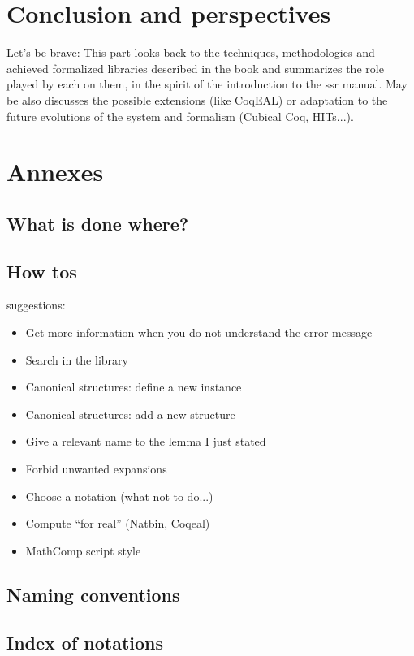 \documentclass{book}
\begin{document}
\part{Conclusion and perspectives}

Let's be brave:
This part looks back to the techniques, methodologies and achieved
formalized libraries described in the book and summarizes the role
played by each on them, in the spirit of the introduction to the ssr manual.
May be also discusses the possible extensions
(like CoqEAL) or adaptation to the future evolutions of the system and
formalism (Cubical Coq, HITs...).

\part{Annexes}


\chapter{What is done where?}

\chapter{How tos}
suggestions:
\begin{itemize}
\item Get more information when you do not understand the error
  message
\item Search in the library
\item Canonical structures: define a new instance
\item Canonical structures: add a new structure
\item Give a relevant name to the lemma I just stated
\item Forbid unwanted expansions
\item Choose a notation (what not to do...)
\item Compute ``for real'' (Natbin, Coqeal)
\item MathComp script style
\end{itemize}

\chapter{Naming conventions}

\chapter{Index of notations}



\end{document}
